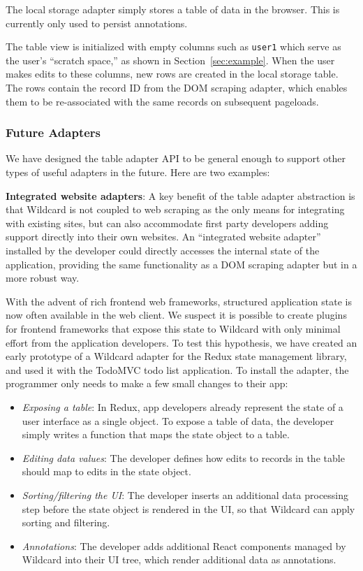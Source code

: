 \documentclass[sigplan,screen,10pt,anonymous,review]{acmart}
\providecommand{\tightlist}{%
  \setlength{\itemsep}{0pt}\setlength{\parskip}{0pt}}
\begin{document}
The local storage adapter simply stores a table of data in the browser.
This is currently only used to persist annotations.

The table view is initialized with empty columns such as \texttt{user1}
which serve as the user's ``scratch space,'' as shown in
Section~\ref{sec:example}. When the user makes edits to these columns,
new rows are created in the local storage table. The rows contain the
record ID from the DOM scraping adapter, which enables them to be
re-associated with the same records on subsequent pageloads.

\hypertarget{future-adapters}{%
\subsubsection{Future Adapters}\label{future-adapters}}

We have designed the table adapter API to be general enough to support
other types of useful adapters in the future. Here are two examples:

\textbf{Integrated website adapters}: A key benefit of the table adapter
abstraction is that Wildcard is not coupled to web scraping as the only
means for integrating with existing sites, but can also accommodate
first party developers adding support directly into their own websites.
An ``integrated website adapter'' installed by the developer could
directly accesses the internal state of the application, providing the
same functionality as a DOM scraping adapter but in a more robust way.

With the advent of rich frontend web frameworks, structured application
state is now often available in the web client. We suspect it is
possible to create plugins for frontend frameworks that expose this
state to Wildcard with only minimal effort from the application
developers. To test this hypothesis, we have created an early prototype
of a Wildcard adapter for the Redux state management library, and used
it with the TodoMVC todo list application. To install the adapter, the
programmer only needs to make a few small changes to their app:

\begin{itemize}
\tightlist
\item
  \emph{Exposing a table}: In Redux, app developers already represent
  the state of a user interface as a single object. To expose a table of
  data, the developer simply writes a function that maps the state
  object to a table.
\item
  \emph{Editing data values}: The developer defines how edits to records
  in the table should map to edits in the state object.
\item
  \emph{Sorting/filtering the UI}: The developer inserts an additional
  data processing step before the state object is rendered in the UI, so
  that Wildcard can apply sorting and filtering.
\item
  \emph{Annotations}: The developer adds additional React components
  managed by Wildcard into their UI tree, which render additional data
  as annotations.
\end{itemize}
\end{document}
